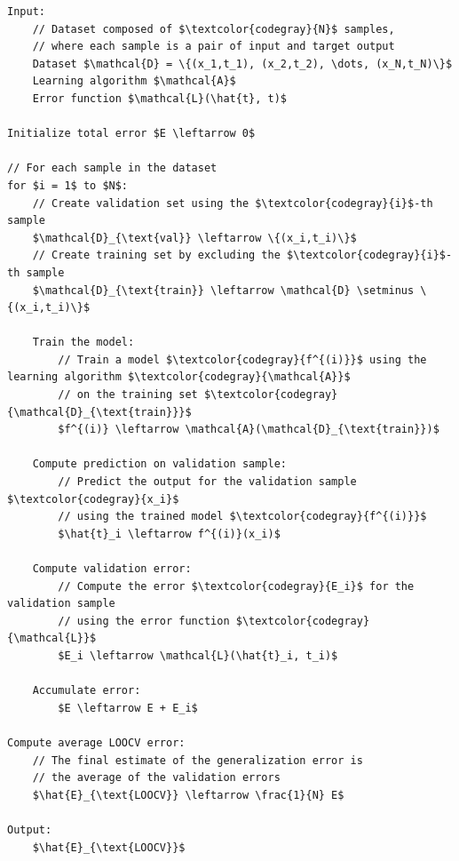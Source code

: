 \begin{lstlisting}[language=pseudo-code,mathescape=true,style={pseudocode-style},caption={Leave-One-Out Cross-Validation Algorithm}]
Input:
    // Dataset composed of $\textcolor{codegray}{N}$ samples,
    // where each sample is a pair of input and target output
    Dataset $\mathcal{D} = \{(x_1,t_1), (x_2,t_2), \dots, (x_N,t_N)\}$
    Learning algorithm $\mathcal{A}$
    Error function $\mathcal{L}(\hat{t}, t)$

Initialize total error $E \leftarrow 0$

// For each sample in the dataset
for $i = 1$ to $N$:
    // Create validation set using the $\textcolor{codegray}{i}$-th sample
    $\mathcal{D}_{\text{val}} \leftarrow \{(x_i,t_i)\}$
    // Create training set by excluding the $\textcolor{codegray}{i}$-th sample
    $\mathcal{D}_{\text{train}} \leftarrow \mathcal{D} \setminus \{(x_i,t_i)\}$

    Train the model:
        // Train a model $\textcolor{codegray}{f^{(i)}}$ using the learning algorithm $\textcolor{codegray}{\mathcal{A}}$
        // on the training set $\textcolor{codegray}{\mathcal{D}_{\text{train}}}$
        $f^{(i)} \leftarrow \mathcal{A}(\mathcal{D}_{\text{train}})$

    Compute prediction on validation sample:
        // Predict the output for the validation sample $\textcolor{codegray}{x_i}$
        // using the trained model $\textcolor{codegray}{f^{(i)}}$
        $\hat{t}_i \leftarrow f^{(i)}(x_i)$

    Compute validation error:
        // Compute the error $\textcolor{codegray}{E_i}$ for the validation sample
        // using the error function $\textcolor{codegray}{\mathcal{L}}$
        $E_i \leftarrow \mathcal{L}(\hat{t}_i, t_i)$

    Accumulate error:
        $E \leftarrow E + E_i$

Compute average LOOCV error:
    // The final estimate of the generalization error is
    // the average of the validation errors
    $\hat{E}_{\text{LOOCV}} \leftarrow \frac{1}{N} E$

Output:
    $\hat{E}_{\text{LOOCV}}$
\end{lstlisting}

